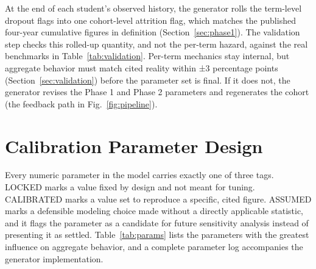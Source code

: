 \documentclass[11pt]{article}
\begin{document}
At the end of each student's observed history, the generator rolls the term-level dropout flags into one cohort-level attrition flag, which matches the published four-year cumulative figures in definition (Section~\ref{sec:phase1}). The validation step checks this rolled-up quantity, and not the per-term hazard, against the real benchmarks in Table~\ref{tab:validation}. Per-term mechanics stay internal, but aggregate behavior must match cited reality within ±3 percentage points (Section~\ref{sec:validation}) before the parameter set is final. If it does not, the generator revises the Phase 1 and Phase 2 parameters and regenerates the cohort (the feedback path in Fig.~\ref{fig:pipeline}).

\FloatBarrier
\section{Calibration Parameter Design}
\label{sec:calibration}

\hspace*{\parindent}Every numeric parameter in the model carries exactly one of three tags. LOCKED marks a value fixed by design and not meant for tuning. CALIBRATED marks a value set to reproduce a specific, cited figure. ASSUMED marks a defensible modeling choice made without a directly applicable statistic, and it flags the parameter as a candidate for future sensitivity analysis instead of presenting it as settled. Table~\ref{tab:params} lists the parameters with the greatest influence on aggregate behavior, and a complete parameter log accompanies the generator implementation.
\end{document}
